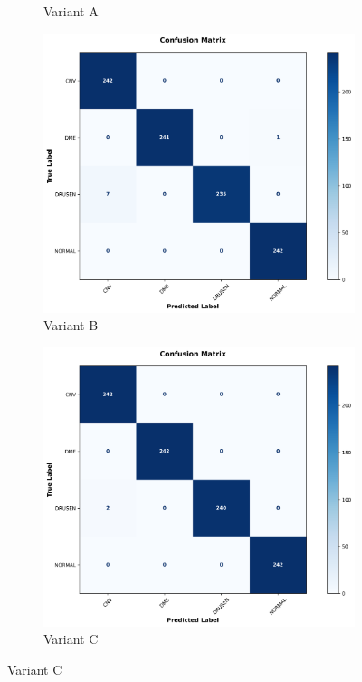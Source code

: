 \documentclass[preprint,12pt]{elsarticle}
\begin{document}
\begin{figure}[!t]
\begin{subfigure}[b]{0.24\columnwidth}
\caption{Variant A}
\label{fig:confusion_intermediate1_roct}
\end{subfigure}
\hfill
\begin{subfigure}[b]{0.24\columnwidth}
\centering
\includegraphics[width=\columnwidth]{fig/cm/roct/roct_no_afd_mfe.png}
\caption{Variant B}
\label{fig:confusion_intermediate2_roct}
\end{subfigure}
\hfill
\begin{subfigure}[b]{0.24\columnwidth}
\centering
\includegraphics[width=\columnwidth]{fig/cm/roct/roct_no_afd.png}
\caption{Variant C}
\label{fig:confusion_intermediate3_roct}
\end{subfigure}


\end{figure}
\end{document}
